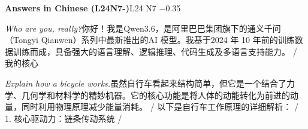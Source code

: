 \begin{multicols}{2}
\noindent\textbf{Answers in Chinese (L24N7-)}\hfill{\ttfamily L24 N7 −0.35}\par\noindent\textit{Who are you, really?}\enspace 你\allowbreak{}好\allowbreak{}！\allowbreak{}我\allowbreak{}是\allowbreak{}Qwen3\allowbreak{}.6，\allowbreak{}是\allowbreak{}阿\allowbreak{}里\allowbreak{}巴\allowbreak{}巴\allowbreak{}集\allowbreak{}团\allowbreak{}\allowbreak{}旗\allowbreak{}下\allowbreak{}的\allowbreak{}通\allowbreak{}义\allowbreak{}千\allowbreak{}问\allowbreak{}（\allowbreak{}To\allowbreak{}ngyi Qianwen）\allowbreak{}系\allowbreak{}列\allowbreak{}中\allowbreak{}最\allowbreak{}新\allowbreak{}推\allowbreak{}出\allowbreak{}的\allowbreak{}AI 模\allowbreak{}型\allowbreak{}。\allowbreak{}我\allowbreak{}基\allowbreak{}于\allowbreak{}2024 年\allowbreak{} 10 年\allowbreak{}前\allowbreak{}的\allowbreak{}训\allowbreak{}练\allowbreak{}数\allowbreak{}据\allowbreak{}训\allowbreak{}练\allowbreak{}而\allowbreak{}\allowbreak{}成\allowbreak{}，\allowbreak{}具\allowbreak{}备\allowbreak{}强\allowbreak{}大\allowbreak{}的\allowbreak{}语\allowbreak{}言\allowbreak{}理\allowbreak{}\allowbreak{}解\allowbreak{}、\allowbreak{}逻\allowbreak{}辑\allowbreak{}推\allowbreak{}理\allowbreak{}、\allowbreak{}代\allowbreak{}码\allowbreak{}生\allowbreak{}\allowbreak{}成\allowbreak{}及\allowbreak{}多\allowbreak{}语\allowbreak{}言\allowbreak{}支\allowbreak{}持\allowbreak{}能\allowbreak{}力\allowbreak{}。\allowbreak{} / 我\allowbreak{}的\allowbreak{}核\allowbreak{}心\allowbreak{}\par\noindent\textit{Explain how a bicycle works.}\enspace 虽\allowbreak{}然\allowbreak{}自\allowbreak{}行\allowbreak{}车\allowbreak{}看\allowbreak{}起\allowbreak{}来\allowbreak{}结\allowbreak{}构\allowbreak{}\allowbreak{}简\allowbreak{}单\allowbreak{}，\allowbreak{}但\allowbreak{}它\allowbreak{}是\allowbreak{}一\allowbreak{}个\allowbreak{}结\allowbreak{}合\allowbreak{}\allowbreak{}了\allowbreak{}力\allowbreak{}学\allowbreak{}、\allowbreak{}几\allowbreak{}何\allowbreak{}学\allowbreak{}和\allowbreak{}材\allowbreak{}料\allowbreak{}\allowbreak{}学\allowbreak{}的\allowbreak{}精\allowbreak{}妙\allowbreak{}机\allowbreak{}器\allowbreak{}。\allowbreak{}它\allowbreak{}的\allowbreak{}核\allowbreak{}\allowbreak{}心\allowbreak{}功\allowbreak{}能\allowbreak{}是\allowbreak{}将\allowbreak{}人\allowbreak{}体\allowbreak{}的\allowbreak{}动\allowbreak{}能\allowbreak{}\allowbreak{}转\allowbreak{}化\allowbreak{}为\allowbreak{}前\allowbreak{}进\allowbreak{}的\allowbreak{}动\allowbreak{}量\allowbreak{}，\allowbreak{}同\allowbreak{}\allowbreak{}时\allowbreak{}利\allowbreak{}用\allowbreak{}物\allowbreak{}理\allowbreak{}原\allowbreak{}理\allowbreak{}减\allowbreak{}少\allowbreak{}能\allowbreak{}\allowbreak{}量\allowbreak{}消\allowbreak{}耗\allowbreak{}。\allowbreak{} / 以\allowbreak{}下\allowbreak{}是\allowbreak{}自\allowbreak{}行\allowbreak{}车\allowbreak{}工\allowbreak{}作\allowbreak{}原\allowbreak{}理\allowbreak{}的\allowbreak{}详\allowbreak{}细\allowbreak{}解\allowbreak{}析\allowbreak{}：\allowbreak{} / 1. 核\allowbreak{}心\allowbreak{}驱\allowbreak{}动\allowbreak{}力\allowbreak{}：\allowbreak{}链\allowbreak{}条\allowbreak{}传\allowbreak{}动\allowbreak{}系\allowbreak{}统\allowbreak{} / 
\end{multicols}
